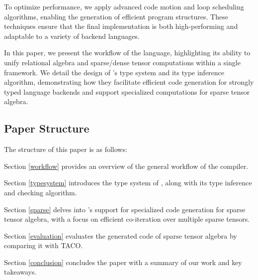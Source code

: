 \documentclass[acmsmall,nonacm]{acmart}\settopmatter{printfolios=true,printccs=false,printacmref=false}
\newcommand{\rhyme}{\text{Rhyme}\xspace}
\begin{document}
To optimize performance, we apply advanced code motion and loop scheduling algorithms, enabling the generation of efficient program structures. These techniques ensure that the final implementation is both high-performing and adaptable to a variety of backend languages.\par

In this paper, we present the workflow of the \rhyme language, highlighting its ability to unify relational algebra and sparse/dense tensor computations within a single framework. We detail the design of \rhyme's type system and its type inference algorithm, demonstrating how they facilitate efficient code generation for strongly typed language backends and support specialized computations for sparse tensor algebra.
\subsection{Paper Structure}

The structure of this paper is as follows:\par \par
Section \ref{workflow} provides an overview of the general workflow of the \rhyme compiler.\par
Section \ref{typesystem} introduces the type system of \rhyme, along with its type inference and checking algorithm.\par
Section \ref{sparse} delves into \rhyme's support for specialized code generation for sparse tensor algebra, with a focus on efficient co-iteration over multiple sparse tensors.\par
Section \ref{evaluation} evaluates the generated code of sparse tensor algebra by comparing it with TACO.\par
Section \ref{conclusion} concludes the paper with a summary of our work and key takeaways.\par
\end{document}
